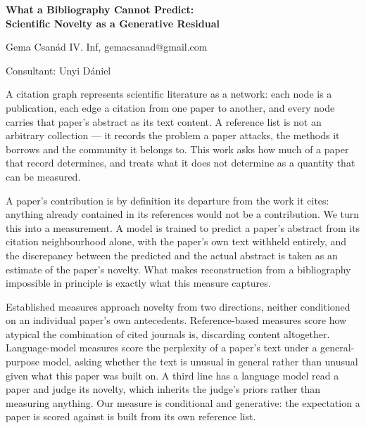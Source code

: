 \documentclass[12pt]{article}
\begin{document}
\begin{center}
    {\Large\bfseries What a Bibliography Cannot Predict: \\
    Scientific Novelty as a Generative Residual}
\end{center}

\vspace{0.8em}

\begin{center}
    Gema Csanád IV. Inf, gemacsanad@gmail.com \\

\end{center}

\vspace{0.4em}

\begin{center}
    Consultant: Unyi Dániel
\end{center}

\vspace{1.2em}


A citation graph represents scientific literature as a network: each
node is a publication, each edge a citation from one paper to
another, and every node carries that paper's abstract as its text
content. A reference list is not an arbitrary collection — it records
the problem a paper attacks, the methods it borrows and the community
it belongs to. This work asks how much of a paper that record
determines, and treats what it does not determine as a quantity that
can be measured.

A paper's contribution is by definition its departure from the work
it cites: anything already contained in its references would not be a
contribution. We turn this into a measurement. A model is trained to
predict a paper's abstract from its citation neighbourhood alone,
with the paper's own text withheld entirely, and the discrepancy
between the predicted and the actual abstract is taken as an estimate
of the paper's novelty. What makes reconstruction from a bibliography
impossible in principle is exactly what this measure captures.

Established measures approach novelty from two directions, neither
conditioned on an individual paper's own antecedents. Reference-based
measures score how atypical the combination of cited journals is,
discarding content altogether. Language-model measures score the
perplexity of a paper's text under a general-purpose model, asking
whether the text is unusual in general rather than unusual given what
this paper was built on. A third line has a language model read a
paper and judge its novelty, which inherits the judge's priors rather
than measuring anything. Our measure is conditional and generative:
the expectation a paper is scored against is built from its own
reference list.
\end{document}
